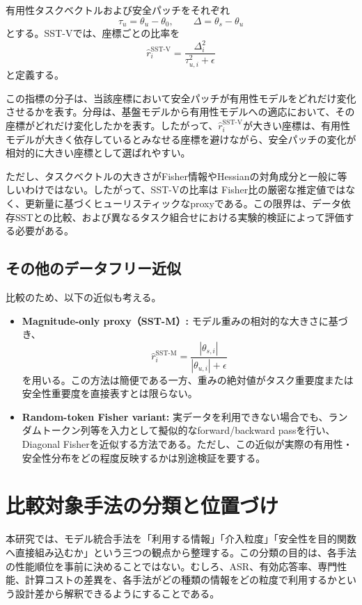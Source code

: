 \documentclass{article}
\begin{document}
有用性タスクベクトルおよび安全パッチをそれぞれ
\[
\tau_u=\theta_u-\theta_0,
\qquad
\Delta=\theta_s-\theta_u
\]
とする。SST-Vでは、座標ごとの比率を
\[
\hat{r}^{\mathrm{SST\text{-}V}}_i
=
\frac{\Delta_i^2}
{\tau_{u,i}^2+\epsilon}
\]
と定義する。

この指標の分子は、当該座標において安全パッチが有用性モデルをどれだけ変化させるかを表す。分母は、基盤モデルから有用性モデルへの適応において、その座標がどれだけ変化したかを表す。したがって、\(\hat{r}^{\mathrm{SST\text{-}V}}_i\)が大きい座標は、有用性モデルが大きく依存しているとみなせる座標を避けながら、安全パッチの変化が相対的に大きい座標として選ばれやすい。

ただし、タスクベクトルの大きさがFisher情報やHessianの対角成分と一般に等しいわけではない。したがって、SST-Vの比率は
Fisher比の厳密な推定値ではなく、更新量に基づくヒューリスティックなproxyである。この限界は、データ依存SSTとの比較、および異なるタスク組合せにおける実験的検証によって評価する必要がある。

\subsection{その他のデータフリー近似}

比較のため、以下の近似も考える。

\begin{itemize}
\item \textbf{Magnitude-only proxy（SST-M）:}
  モデル重みの相対的な大きさに基づき、
  \[
  \hat{r}^{\mathrm{SST\text{-}M}}_i
  =
  \frac{|\theta_{s,i}|}
  {|\theta_{u,i}|+\epsilon}
  \]
  を用いる。この方法は簡便である一方、重みの絶対値がタスク重要度または安全性重要度を直接表すとは限らない。

\item \textbf{Random-token Fisher variant:}
  実データを利用できない場合でも、ランダムトークン列等を入力として擬似的なforward/backward passを行い、Diagonal Fisherを近似する方法である。ただし、この近似が実際の有用性・安全性分布をどの程度反映するかは別途検証を要する。
\end{itemize}

\section{比較対象手法の分類と位置づけ}
\label{app:method-taxonomy}

本研究では、モデル統合手法を「利用する情報」「介入粒度」「安全性を目的関数へ直接組み込むか」という三つの観点から整理する。この分類の目的は、各手法の性能順位を事前に決めることではない。むしろ、ASR、有効応答率、専門性能、計算コストの差異を、各手法がどの種類の情報をどの粒度で利用するかという設計差から解釈できるようにすることである。
\end{document}
